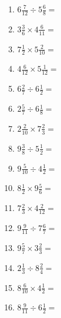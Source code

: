 \documentclass[12pt]{article}
\begin{document}
\begin{enumerate}
\item \large $ 6 \frac{7}{12} \div 5 \frac{6}{8} = $ \vspace{1.6cm}
\item \large $ 3 \frac{3}{6} \times 4 \frac{6}{11} = $ \vspace{1.6cm}
\item \large $ 7 \frac{1}{2} \times 5 \frac{2}{10} = $ \vspace{1.6cm}
\item \large $ 4 \frac{6}{12} \times 5 \frac{1}{12} = $ \vspace{1.6cm}
\item \large $ 6 \frac{2}{7} \div 6 \frac{1}{2} = $ \vspace{1.6cm}
\item \large $ 2 \frac{5}{7} \div 6 \frac{1}{8} = $ \vspace{1.6cm}
\newpage
\item \large $ 2 \frac{2}{10} \times 7 \frac{2}{3} = $ \vspace{1.6cm}
\item \large $ 9 \frac{3}{8} \div 5 \frac{1}{2} = $ \vspace{1.6cm}
\item \large $ 9 \frac{5}{10} \div 4 \frac{1}{2} = $ \vspace{1.6cm}
\item \large $ 8 \frac{1}{2} \times 9 \frac{5}{6} = $ \vspace{1.6cm}
\item \large $ 7 \frac{2}{3} \times 4 \frac{2}{12} = $ \vspace{1.6cm}
\item \large $ 9 \frac{9}{11} \div 7 \frac{6}{7} = $ \vspace{1.6cm}
\item \large $ 9 \frac{5}{7} \times 3 \frac{2}{3} = $ \vspace{1.6cm}
\item \large $ 2 \frac{1}{3} \div 8 \frac{2}{4} = $ \vspace{1.6cm}
\item \large $ 8 \frac{6}{10} \times 4 \frac{1}{2} = $ \vspace{1.6cm}
\item \large $ 8 \frac{9}{11} \div 6 \frac{1}{2} = $ \vspace{1.6cm}
\end{enumerate}
\newpage
\end{document}
